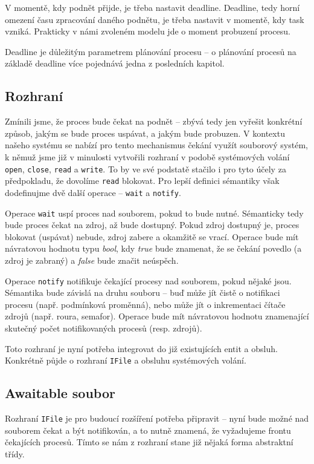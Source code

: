 \documentclass{article}
\begin{document}
V momentě, kdy podnět přijde, je třeba nastavit deadline. Deadline, tedy horní omezení času zpracování daného podnětu, je třeba nastavit v momentě, kdy task vzniká. Prakticky v námi zvoleném modelu jde o moment probuzení procesu.

Deadline je důležitým parametrem plánování procesu -- o plánování procesů na základě deadline více pojednává jedna z posledních kapitol.

\subsection{Rozhraní}

Zmínili jsme, že proces bude čekat na podnět -- zbývá tedy jen vyřešit konkrétní způsob, jakým se bude proces uspávat, a jakým bude probuzen. V kontextu našeho systému se nabízí pro tento mechanismus čekání využít souborový systém, k němuž jsme již v minulosti vytvořili rozhraní v podobě systémových volání \texttt{open}, \texttt{close}, \texttt{read} a \texttt{write}. To by ve své podstatě stačilo i pro tyto účely za předpokladu, že dovolíme \texttt{read} blokovat. Pro lepší definici sémantiky však dodefinujme dvě další operace -- \texttt{wait} a \texttt{notify}.

Operace \texttt{wait} uspí proces nad souborem, pokud to bude nutné. Sémanticky tedy bude proces čekat na zdroj, až bude dostupný. Pokud zdroj dostupný je, proces blokovat (uspávat) nebude, zdroj zabere a okamžitě se vrací. Operace bude mít návratovou hodnotu typu \emph{bool}, kdy \emph{true} bude znamenat, že se čekání povedlo (a zdroj je zabraný) a \emph{false} bude značit neúspěch.

Operace \texttt{notify} notifikuje čekající procesy nad souborem, pokud nějaké jsou. Sémantika bude závislá na druhu souboru -- buď může jít čistě o notifikaci procesu (např. podmínková proměnná), nebo může jít o inkrementaci čítače zdrojů (např. roura, semafor). Operace bude mít návratovou hodnotu znamenající skutečný počet notifikovaných procesů (resp. zdrojů).

Toto rozhraní je nyní potřeba integrovat do již existujících entit a obsluh. Konkrétně půjde o rozhraní \texttt{IFile} a obsluhu systémových volání.

\subsection{Awaitable soubor}

Rozhraní \texttt{IFile} je pro budoucí rozšíření potřeba připravit -- nyní bude možné nad souborem čekat a být notifikován, a to nutně znamená, že vyžadujeme frontu čekajících procesů. Tímto se nám z rozhraní stane již nějaká forma abstraktní třídy.
\end{document}
